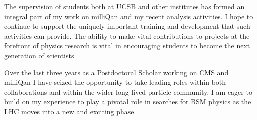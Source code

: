 \documentclass[11pt]{article}
\theoremstyle{plain} \numberwithin{equation}{section}
\theoremstyle{definition}
\begin{document}
The supervision of students both at UCSB and other institutes has 
formed an integral part of my work on milliQan and my recent analysis activities.
I hope to continue to support the uniquely important training and development 
that such activities can provide. The ability to make vital contributions
to projects at the forefront of physics research is vital in encouraging
students to become the next generation of scientists.

Over the last three years as a Postdoctoral Scholar working on CMS and milliQan
I have seized the opportunity to take leading roles within both collaborations 
and within the wider long-lived particle community. I am eager to build on my experience to play 
a pivotal role in searches for BSM physics as the LHC moves into a new and exciting phase. 
 


\end{document}
